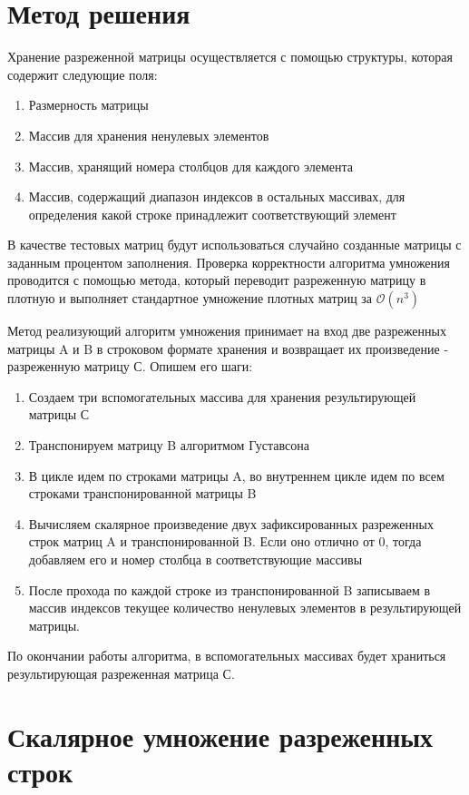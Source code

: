 \documentclass{report}
\begin{document}
\section*{Метод решения}
Хранение разреженной матрицы осуществляется с помощью структуры, которая содержит следующие поля:
\begin{enumerate}
\item Размерность матрицы
\item Массив для хранения ненулевых элементов
\item Массив, хранящий номера столбцов для каждого элемента
\item Массив, содержащий диапазон индексов в остальных массивах, для определения какой строке принадлежит соответствующий элемент
\end{enumerate}
В качестве тестовых матриц будут использоваться случайно созданные матрицы с заданным процентом заполнения. Проверка корректности алгоритма умножения проводится с помощью метода, который переводит разреженную матрицу в плотную и выполняет стандартное умножение плотных матриц за $\mathcal{O}(n^3)$

\par Метод реализующий алгоритм умножения принимает на вход две разреженных матрицы A и B в строковом формате хранения и возвращает их произведение - разреженную матрицу С. Опишем его шаги:
\begin{enumerate}
\item Создаем три вспомогательных массива для хранения результирующей матрицы С
\item Транспонируем матрицу B алгоритмом Густавсона
\item В цикле идем по строками матрицы A, во внутреннем цикле идем по всем строками транспонированной матрицы B
\item Вычисляем скалярное произведение двух зафиксированных разреженных строк матриц A и транспонированной B. Если оно отлично от 0, тогда добавляем его и номер столбца в соответствующие массивы
\item После прохода по каждой строке из транспонированной B записываем в массив индексов текущее количество ненулевых элементов в результирующей матрицы.
\end{enumerate}
По окончании работы алгоритма, в вспомогательных массивах будет храниться результирующая разреженная матрица С.

\newpage

\section*{Скалярное умножение разреженных строк}
\end{document}
